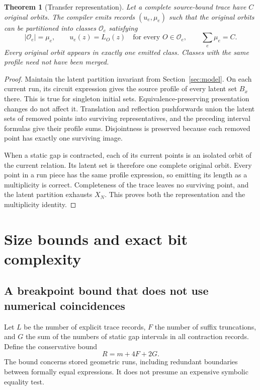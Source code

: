 \documentclass[11pt]{article}
\newtheorem{theorem}{Theorem}[section]
\theoremstyle{definition}\newtheorem{definition}[theorem]{Definition}
\theoremstyle{remark}\newtheorem{remark}[theorem]{Remark}
\newcommand{\orbits}{\mathcal O}
\begin{document}
\begin{theorem}[Transfer representation]
\label{thm:representation}
Let a complete source-bound trace have $C$ original orbits. The compiler emits
records $(u_e,\mu_e)$ such that the original orbits can be partitioned into
classes $\orbits_e$ satisfying
\[
 |\orbits_e|=\mu_e,\qquad
 u_e(z)=L_O(z)\quad\text{for every }O\in\orbits_e,
 \qquad \sum_e\mu_e=C.
\]
Every original orbit appears in exactly one emitted class. Classes with the
same profile need not have been merged.
\end{theorem}
\begin{proof}
Maintain the latent partition invariant from Section~\ref{sec:model}. On each
current run, its circuit expression gives the source profile of every latent
set $B_x$ there. This is true for singleton initial sets. Equivalence-preserving
presentation changes do not affect it. Translation and reflection pushforwards
union the latent sets of removed points into surviving representatives, and
the preceding interval formulas give their profile sums. Disjointness is
preserved because each removed point has exactly one surviving image.

When a static gap is contracted, each of its current points is an isolated orbit
of the current relation. Its latent set is therefore one complete original
orbit. Every point in a run piece has the same profile expression, so emitting
its length as a multiplicity is correct. Completeness of the trace leaves no
surviving point, and the latent partition exhausts $X_N$. This proves both the
representation and the multiplicity identity.
\end{proof}

\section{Size bounds and exact bit complexity}
\label{sec:cost}

\subsection{A breakpoint bound that does not use numerical coincidences}
Let $L$ be the number of explicit trace records, $F$ the number of suffix
truncations, and $G$ the sum of the numbers of static gap intervals in all
contraction records. Define the conservative bound
\begin{equation}
 R=m+4F+2G.
 \label{eq:R}
\end{equation}
The bound concerns stored geometric runs, including redundant boundaries between
formally equal expressions. It does not presume an expensive symbolic equality
test.
\end{document}
